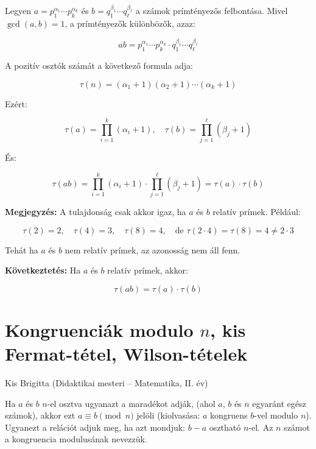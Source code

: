 \begin{solution}
Legyen $a=p_{1}^{\alpha_{1}}\cdots p_{k}^{\alpha_{k}}$ és $b=q_{1}^{\beta_{1}}\cdots q_{\ell}^{\beta_{\ell}}$
a számok prímtényezős felbontása. Mivel $\gcd(a,b)=1$, a prímtényezők
különbözők, azaz:

\[
ab=p_{1}^{\alpha_{1}}\cdots p_{k}^{\alpha_{k}}\cdot q_{1}^{\beta_{1}}\cdots q_{\ell}^{\beta_{\ell}}
\]

A pozitív osztók számát a következő formula adja:

\[
\tau(n)=(\alpha_{1}+1)(\alpha_{2}+1)\cdots(\alpha_{k}+1)
\]

Ezért:

\[
\tau(a)=\prod_{i=1}^{k}(\alpha_{i}+1),\quad\tau(b)=\prod_{j=1}^{\ell}(\beta_{j}+1)
\]

És:

\[
\tau(ab)=\prod_{i=1}^{k}(\alpha_{i}+1)\cdot\prod_{j=1}^{\ell}(\beta_{j}+1)=\tau(a)\cdot\tau(b)
\]

\textbf{Megjegyzés:} A tulajdonság csak akkor igaz, ha $a$ és $b$
relatív prímek. Például:

\[
\tau(2)=2,\quad\tau(4)=3,\quad\tau(8)=4,\quad\text{de }\tau(2\cdot4)=\tau(8)=4\neq2\cdot3
\]

Tehát ha $a$ és $b$ nem relatív prímek, az azonosság nem áll fenn.

\medskip{}

\textbf{Következtetés:} Ha $a$ és $b$ relatív prímek, akkor:

\[
\boxed{\tau(ab)=\tau(a)\cdot\tau(b)}
\]
\end{solution}



\section{Kongruenciák modulo $n$, kis Fermat-tétel, Wilson-tételek}\label{sec:Fermat-Wilson}
\begin{description}
	{\large \item [{Szerző:}] Kis Brigitta (Didaktikai mesteri -- Matematika, II. év)}
\end{description}
Ha $a$ és $b$ $n$-el osztva ugyanazt a maradékot adják, (ahol $a$,
$b$ és $n$ egyaránt egész számok), akkor ezt $a\equiv b\pmod n$
jelöli (kiolvasása: $a$ kongruens $b$-vel modulo $n$). Ugyanezt
a relációt adjuk meg, ha azt mondjuk: $b-a$ osztható $n$-el. Az
$n$ számot a kongruencia modulusának nevezzük.

